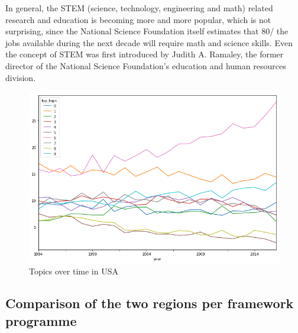 \documentclass[12pt]{report}
\begin{document}
In general, the STEM (science, technology, engineering and math) related
research and education is becoming more and more popular, which is not
surprising, since the National Science Foundation itself estimates that 80/%
the jobs available during the next decade will require math and science skills.
Even the concept of STEM was first introduced by Judith A. Ramaley, the former
director of the National Science Foundation’s education and human resources
division.
\begin{center}
\begin{figure}
\includegraphics[width=1.0\textwidth]
{figs/topic-evolution-usa.png}
\caption{Topics over time in USA}
\end{figure}
\end{center}

\subsection{Comparison of the two regions per framework programme}
\end{document}
